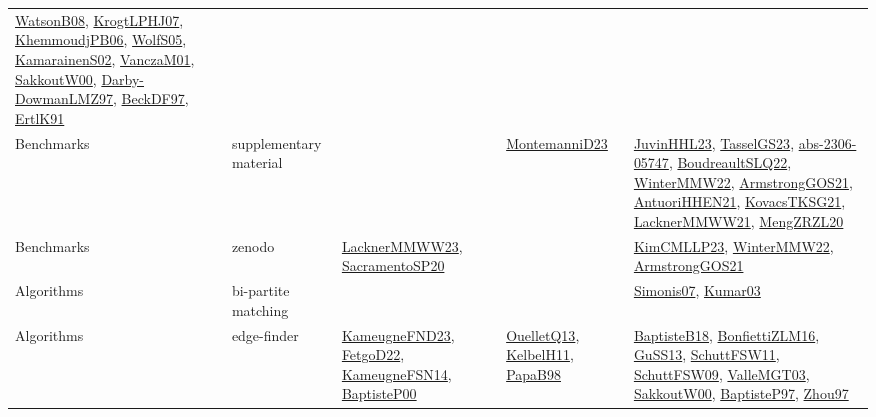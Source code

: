 {\begin{longtable}{lp{3cm}>{\raggedright}p{6cm}>{\raggedright}p{6cm}p{8cm}}
\href{papers/WatsonB08.pdf}{WatsonB08}\cite{WatsonB08}, \href{papers/KrogtLPHJ07.pdf}{KrogtLPHJ07}\cite{KrogtLPHJ07}, \href{papers/KhemmoudjPB06.pdf}{KhemmoudjPB06}\cite{KhemmoudjPB06}, \href{papers/WolfS05.pdf}{WolfS05}\cite{WolfS05}, \href{papers/KamarainenS02.pdf}{KamarainenS02}\cite{KamarainenS02}, \href{papers/VanczaM01.pdf}{VanczaM01}\cite{VanczaM01}, \href{articles/SakkoutW00.pdf}{SakkoutW00}\cite{SakkoutW00}, \href{articles/Darby-DowmanLMZ97.pdf}{Darby-DowmanLMZ97}\cite{Darby-DowmanLMZ97}, \href{papers/BeckDF97.pdf}{BeckDF97}\cite{BeckDF97}, \href{papers/ErtlK91.pdf}{ErtlK91}\cite{ErtlK91}\\
Benchmarks & supplementary material &  & \href{articles/MontemanniD23.pdf}{MontemanniD23}\cite{MontemanniD23} & \href{papers/JuvinHHL23.pdf}{JuvinHHL23}\cite{JuvinHHL23}, \href{papers/TasselGS23.pdf}{TasselGS23}\cite{TasselGS23}, \href{articles/abs-2306-05747.pdf}{abs-2306-05747}\cite{abs-2306-05747}, \href{papers/BoudreaultSLQ22.pdf}{BoudreaultSLQ22}\cite{BoudreaultSLQ22}, \href{papers/WinterMMW22.pdf}{WinterMMW22}\cite{WinterMMW22}, \href{papers/ArmstrongGOS21.pdf}{ArmstrongGOS21}\cite{ArmstrongGOS21}, \href{papers/AntuoriHHEN21.pdf}{AntuoriHHEN21}\cite{AntuoriHHEN21}, \href{papers/KovacsTKSG21.pdf}{KovacsTKSG21}\cite{KovacsTKSG21}, \href{papers/LacknerMMWW21.pdf}{LacknerMMWW21}\cite{LacknerMMWW21}, \href{articles/MengZRZL20.pdf}{MengZRZL20}\cite{MengZRZL20}\\
Benchmarks & zenodo & \href{articles/LacknerMMWW23.pdf}{LacknerMMWW23}\cite{LacknerMMWW23}, \href{articles/SacramentoSP20.pdf}{SacramentoSP20}\cite{SacramentoSP20} &  & \href{papers/KimCMLLP23.pdf}{KimCMLLP23}\cite{KimCMLLP23}, \href{papers/WinterMMW22.pdf}{WinterMMW22}\cite{WinterMMW22}, \href{papers/ArmstrongGOS21.pdf}{ArmstrongGOS21}\cite{ArmstrongGOS21}\\
Algorithms & bi-partite matching &  &  & \href{articles/Simonis07.pdf}{Simonis07}\cite{Simonis07}, \href{papers/Kumar03.pdf}{Kumar03}\cite{Kumar03}\\
Algorithms & edge-finder & \href{papers/KameugneFND23.pdf}{KameugneFND23}\cite{KameugneFND23}, \href{articles/FetgoD22.pdf}{FetgoD22}\cite{FetgoD22}, \href{articles/KameugneFSN14.pdf}{KameugneFSN14}\cite{KameugneFSN14}, \href{articles/BaptisteP00.pdf}{BaptisteP00}\cite{BaptisteP00} & \href{papers/OuelletQ13.pdf}{OuelletQ13}\cite{OuelletQ13}, \href{articles/KelbelH11.pdf}{KelbelH11}\cite{KelbelH11}, \href{articles/PapaB98.pdf}{PapaB98}\cite{PapaB98} & \href{articles/BaptisteB18.pdf}{BaptisteB18}\cite{BaptisteB18}, \href{papers/BonfiettiZLM16.pdf}{BonfiettiZLM16}\cite{BonfiettiZLM16}, \href{papers/GuSS13.pdf}{GuSS13}\cite{GuSS13}, \href{articles/SchuttFSW11.pdf}{SchuttFSW11}\cite{SchuttFSW11}, \href{papers/SchuttFSW09.pdf}{SchuttFSW09}\cite{SchuttFSW09}, \href{papers/ValleMGT03.pdf}{ValleMGT03}\cite{ValleMGT03}, \href{articles/SakkoutW00.pdf}{SakkoutW00}\cite{SakkoutW00}, \href{papers/BaptisteP97.pdf}{BaptisteP97}\cite{BaptisteP97}, \href{articles/Zhou97.pdf}{Zhou97}\cite{Zhou97}\\

\end{longtable}}
